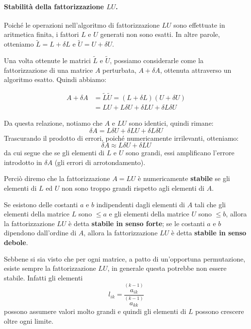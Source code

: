 \documentclass{article}
\begin{document}
\paragraph{Stabilità della fattorizzazione $LU$.}
Poiché le operazioni nell'algoritmo di fattorizzazione $LU$ sono
effettuate in aritmetica finita, i fattori $L$ e $U$ generati non sono esatti.
In altre parole, otteniamo $\tilde{L}=L+\delta L$ e $\tilde{U}=U+\delta U$.

Una volta ottenute le matrici $\tilde{L}$ e $\tilde{U}$, possiamo considerarle
come la fattorizzazione di una matrice $A$ perturbata, $A+\delta A$, ottenuta
attraverso un algoritmo esatto. Quindi abbiamo:

\begin{equation*}
   \begin{aligned}
       A+\delta A&=\tilde{L}\tilde{U}=(L+\delta L)(U+\delta U)\\ 
                 &=LU+L\delta U+\delta LU+\delta L\delta U
   \end{aligned} 
\end{equation*}

Da questa relazione, notiamo che $A$ e $LU$ sono identici, quindi rimane:
$$\delta A=L\delta U+\delta LU+\delta L\delta U$$ 
Trascurando il prodotto di errori, poiché numericamente irrilevanti, otteniamo:
$$\delta A\approx L\delta U+\delta LU$$
da cui segue che se gli elementi di $L$ e $U$ sono grandi, essi amplificano
l'errore introdotto in $\delta A$ (gli errori di arrotondamento).

Perciò diremo che la fattorizzazione $A=LU$ è numericamente \textbf{stabile}
se gli elementi di $L$ ed $U$ non sono troppo grandi rispetto agli elementi di
$A$.
\begin{definition}
   Se esistono delle costanti $a$ e $b$ indipendenti dagli elementi di $A$
   tali che gli elementi della matrice $L$ sono $\leq a$ e gli elementi della
   matrice $U$ sono $\leq b$, allora la fattorizzazione $LU$ è detta
   \textbf{stabile in senso forte}; se le costanti $a$ e $b$ dipendono
   dall'ordine di $A$, allora la fattorizzazione $LU$ è detta \textbf{stabile
   in senso debole}.
\end{definition}

Sebbene si sia visto che per ogni matrice, a patto di un'opportuna
permutazione, esiste sempre la fattorizzazione $LU$, in generale questa
potrebbe non essere stabile. Infatti gli elementi
$$l_{ik}=\frac{\overset{(k-1)}{a_{ik}}}{\overset{(k-1)}{a_{kk}}}$$
possono assumere valori molto grandi e quindi gli elementi di $L$ possono
crescere oltre ogni limite.
\end{document}
